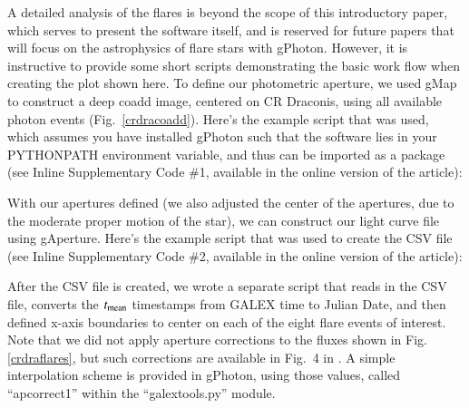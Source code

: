 \documentclass[5p]{elsarticle}
\begin{document}
A detailed analysis of the flares is beyond the scope of this introductory paper, which serves to present the software itself, and is reserved for future papers that will focus on the astrophysics of flare stars with gPhoton.  However, it is instructive to provide some short scripts demonstrating the basic work flow when creating the plot shown here.  To define our photometric aperture, we used gMap to construct a deep coadd image, centered on CR Draconis, using all available photon events (Fig.\ \ref{crdracoadd}).  Here's the example script that was used, which assumes you have installed gPhoton such that the software lies in your PYTHONPATH environment variable, and thus can be imported as a package (see Inline Supplementary Code \#1, available in the online version of the article):


With our apertures defined (we also adjusted the center of the apertures, due to the moderate proper motion of the star), we can construct our light curve file using gAperture.  Here's the example script that was used to create the CSV file (see Inline Supplementary Code \#2, available in the online version of the article):


After the CSV file is created, we wrote a separate script that reads in the CSV file, converts the $t_{\rm{mean}}$ timestamps from GALEX time to Julian Date, and then defined x-axis boundaries to center on each of the eight flare events of interest.  Note that we did not apply aperture corrections to the fluxes shown in Fig. \ref{crdraflares}, but such corrections are available in Fig.\ 4 in \citet{mor2007}.  A simple interpolation scheme is provided in gPhoton, using those values, called ``apcorrect1'' within the ``galextools.py'' module.
\end{document}
